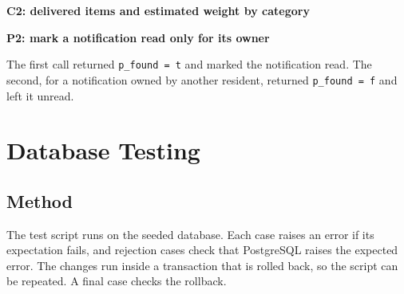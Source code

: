\documentclass[11pt,letterpaper]{article}
\begin{document}
\textbf{C2: delivered items and estimated weight by category}



\textbf{P2: mark a notification read only for its owner}

The first call returned \texttt{p\_found = t} and marked the notification read. The second, for a notification owned by another resident, returned \texttt{p\_found = f} and left it unread.

\section{Database Testing}
\label{sec:testing}
\subsection{Method}
The test script  runs on the seeded database. Each case raises an error if its expectation fails, and rejection cases check that PostgreSQL raises the expected error. The changes run inside a transaction that is rolled back, so the script can be repeated. A final case checks the rollback.
\end{document}
